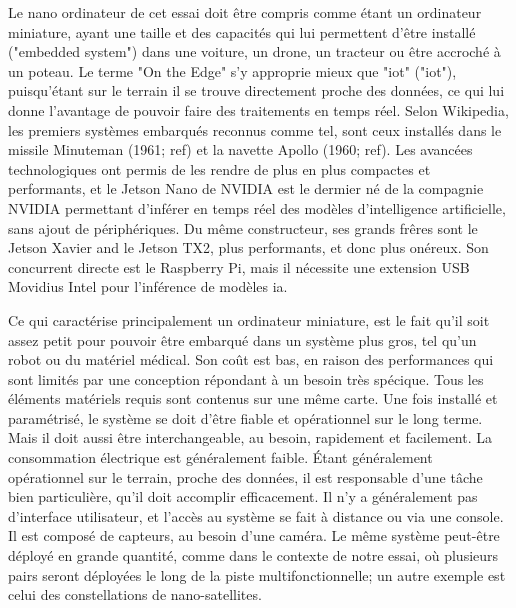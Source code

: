 ﻿\par Le nano ordinateur de cet essai doit être compris comme étant un ordinateur miniature, ayant une taille et des capacités qui lui permettent d'être installé ("embedded system") dans une voiture, un drone, un tracteur ou être accroché à un poteau. Le terme "On the Edge" s'y approprie mieux que "\acrshort{iot}" ("\acrlong{iot}"), puisqu'étant sur le terrain il se trouve directement proche des données, ce qui lui donne l'avantage de pouvoir faire des traitements en temps réel. Selon Wikipedia, les premiers systèmes embarqués reconnus comme tel, sont ceux installés dans le missile Minuteman (1961; ref) et la navette Apollo (1960; ref). Les avancées technologiques ont permis de les rendre de plus en plus compactes et performants, et le Jetson Nano de NVIDIA est le dermier né de la compagnie NVIDIA permettant d'inférer en temps réel des modèles d'intelligence artificielle, sans ajout de périphériques. Du même constructeur, ses grands frêres sont le Jetson Xavier and le Jetson TX2, plus performants, et donc plus onéreux. Son concurrent directe est le Raspberry Pi, mais il nécessite une extension USB Movidius Intel pour l'inférence de modèles \acrshort{ia}. 
\par Ce qui caractérise principalement un ordinateur miniature, est le fait qu'il soit assez petit pour pouvoir être embarqué dans un système plus gros, tel qu'un robot ou du matériel médical. Son coût est bas, en raison des performances qui sont limités par une conception répondant à un besoin très spécique. Tous les éléments matériels requis sont contenus sur une même carte.  Une fois installé et paramétrisé, le système se doit d'être fiable et opérationnel sur le long terme. Mais il doit aussi être interchangeable, au besoin, rapidement et facilement. La consommation électrique est généralement faible. Étant généralement opérationnel sur le terrain, proche des données, il est responsable d'une tâche bien particulière, qu'il doit accomplir efficacement. Il n'y a généralement pas d'interface utilisateur, et l'accès au système se fait à distance ou via une console. Il est composé de capteurs, au besoin d'une caméra. Le même système peut-être déployé en grande quantité, comme dans le contexte de notre essai, où plusieurs pairs seront déployées le long de la piste multifonctionnelle; un autre exemple est celui des constellations de nano-satellites.
